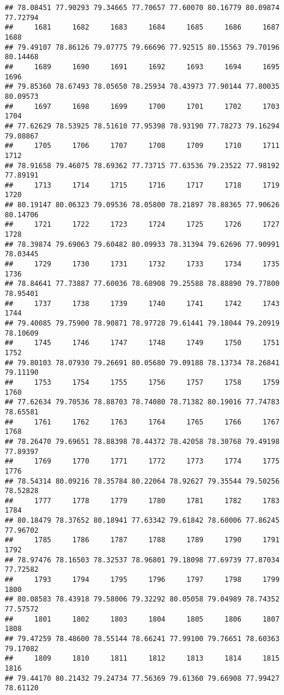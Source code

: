 \documentclass[
]{article}
\begin{document}
\begin{verbatim}
## 78.08451 77.90293 79.34665 77.70657 77.60070 80.16779 80.09874 77.72794 
##     1681     1682     1683     1684     1685     1686     1687     1688 
## 79.49107 78.86126 79.07775 79.66696 77.92515 80.15563 79.70196 80.14468 
##     1689     1690     1691     1692     1693     1694     1695     1696 
## 79.85360 78.67493 78.05650 78.25934 78.43973 77.90144 77.80035 80.09573 
##     1697     1698     1699     1700     1701     1702     1703     1704 
## 77.62629 78.53925 78.51610 77.95398 78.93190 77.78273 79.16294 79.08867 
##     1705     1706     1707     1708     1709     1710     1711     1712 
## 78.91658 79.46075 78.69362 77.73715 77.63536 79.23522 77.98192 77.89191 
##     1713     1714     1715     1716     1717     1718     1719     1720 
## 80.19147 80.06323 79.09536 78.05800 78.21897 78.88365 77.90626 80.14706 
##     1721     1722     1723     1724     1725     1726     1727     1728 
## 78.39874 79.69063 79.60482 80.09933 78.31394 79.62696 77.90991 78.03445 
##     1729     1730     1731     1732     1733     1734     1735     1736 
## 78.84641 77.73887 77.60036 78.68908 79.25588 78.88890 79.77800 78.95401 
##     1737     1738     1739     1740     1741     1742     1743     1744 
## 79.40085 79.75900 78.90871 78.97728 79.61441 79.18044 79.20919 78.10609 
##     1745     1746     1747     1748     1749     1750     1751     1752 
## 79.80103 78.07930 79.26691 80.05680 79.09188 78.13734 78.26841 79.11190 
##     1753     1754     1755     1756     1757     1758     1759     1760 
## 77.62634 79.70536 78.88703 78.74080 78.71382 80.19016 77.74783 78.65581 
##     1761     1762     1763     1764     1765     1766     1767     1768 
## 78.26470 79.69651 78.88398 78.44372 78.42058 78.30768 79.49198 77.89397 
##     1769     1770     1771     1772     1773     1774     1775     1776 
## 78.54314 80.09216 78.35784 80.22064 78.92627 79.35544 79.50256 78.52828 
##     1777     1778     1779     1780     1781     1782     1783     1784 
## 80.18479 78.37652 80.18941 77.63342 79.61842 78.60006 77.86245 77.96702 
##     1785     1786     1787     1788     1789     1790     1791     1792 
## 78.97476 78.16503 78.32537 78.96801 79.18098 77.69739 77.87034 77.72582 
##     1793     1794     1795     1796     1797     1798     1799     1800 
## 80.08583 78.43918 79.58006 79.32292 80.05058 79.04989 78.74352 77.57572 
##     1801     1802     1803     1804     1805     1806     1807     1808 
## 79.47259 78.48600 78.55144 78.66241 77.99100 79.76651 78.60363 79.17082 
##     1809     1810     1811     1812     1813     1814     1815     1816 
## 79.44170 80.21432 79.24734 77.56369 79.61360 79.66908 77.99427 78.61120 

\end{verbatim}
\end{document}
